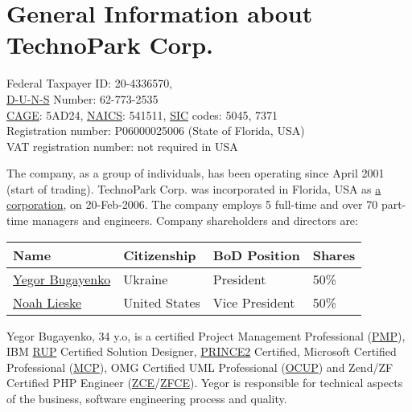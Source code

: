 
\section*{General Information about TechnoPark Corp.}

Federal Taxpayer ID: 20-4336570, \\
\href{https://smallbusiness.dnb.com}{D-U-N-S} Number: 62-773-2535 \\
\href{http://www.dlis.dla.mil/cage_welcome.asp}{CAGE}: 5AD24, 
	\href{http://www.census.gov/eos/www/naics/}{NAICS}: 541511, 
	\href{http://www.osha.gov/pls/imis/sicsearch.html}{SIC} codes: 5045, 7371 \\
Registration number: P06000025006 (State of Florida, USA) \\
VAT registration number: not required in USA

The company, as a group of individuals, has been operating since April 2001 (start of trading). 
TechnoPark Corp. was incorporated in Florida, USA as 
\href{http://en.wikipedia.org/wiki/Corporation}{a corporation}, on 20-Feb-2006.
The company employs 5 full-time and over 70 part-time managers and engineers.
Company shareholders and directors are:

\begin{tabular}{llll}
Name & 		Citizenship & 	BoD Position & 	Shares \\
\hline
\href{mailto:egor@technoparkcorp.com}{Yegor Bugayenko}	& 	Ukraine &		President & 	50\% \\
\href{mailto:noah@technoparkcorp.com}{Noah Lieske} &	United States & 	Vice President & 	50\% \\
\end{tabular}

Yegor Bugayenko, 34 y.o, is a certified 
Project Management Professional (\href{http://en.wikipedia.org/wiki/Project_Management_Professional}{PMP}), 
IBM \href{http://www-03.ibm.com/certify/certs/38008003.shtml}{RUP} Certified Solution Designer, 
\href{http://www.prince2.com/}{PRINCE2} Certified,
Microsoft Certified Professional (\href{http://www.microsoft.com/learning/mcp/mcp/}{MCP}), 
OMG Certified UML Professional (\href{http://www.omg.org/uml-certification/}{OCUP}) and 
Zend/ZF Certified PHP Engineer (\href{http://www.zend.com/en/services/certification/}{ZCE}/\href{http://www.zend.com/en/services/certification/}{ZFCE}).
Yegor is responsible for technical aspects of the business, software engineering process
and quality.

